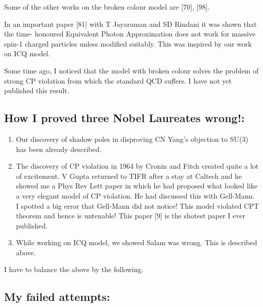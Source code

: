 Some of the other works on the broken colour model are [70], [98].

In an important paper [81] with T Jayaraman and SD Rindani it was shown 
that the time- honoured Equivalent Photon Approxi\-mation does not work 
for massive spin-1 charged particles unless modified suitably. This was 
inspired by our work on ICQ model.

Some time ago, I noticed that the model with broken colour solves the 
problem of strong CP violation from which the standard QCD suffers. I 
have not yet published this result.

\subsection*{How I proved three Nobel Laureates wrong!:}

\begin{enumerate}
\itemsep=0pt
\item Our discovery of shadow poles in disproving CN Yang's objec\-tion to 
SU(3) has been already described.
\item The discovery of CP violation in 1964 by Cronin and Fitch created 
quite a lot of excitement. V Gupta returned to TIFR after a stay at 
Caltech and he showed me a Phys Rev Lett paper in which he had proposed 
what looked like a very elega\-nt model of CP violation. He had discussed 
this with Gell-Mann. I spotted a big error that Gell-Mann did not 
notice! This model violated CPT theorem and hence is untenab\-le! This 
paper [9] is the shotest paper I ever published.
\item While working on ICQ model, we showed Salam was wrong. This is 
described above.
\end{enumerate}

I have to balance the above by the following.

\subsection*{My failed attempts:}

